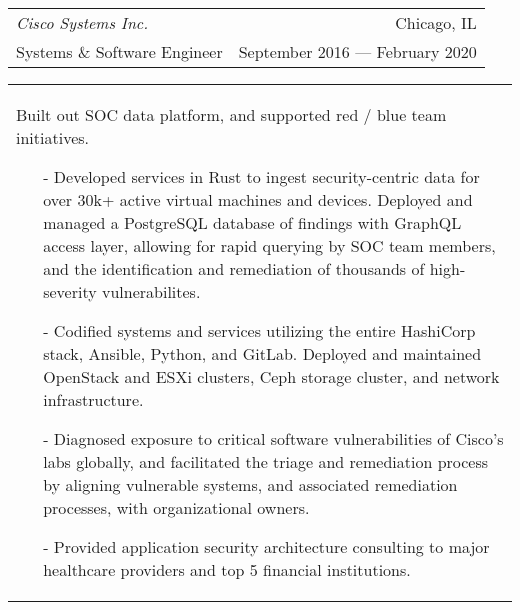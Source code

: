 \begin{tabularx}{\textwidth}{L R}
    \normalsize\textit{Cisco Systems Inc.} & Chicago, IL \\
    \hspace{10pt}Systems \& Software Engineer & September 2016 --- February 2020 \\
\end{tabularx}
\begin{tabularx}{\textwidth}{X}
    \hspace{10pt}Built out SOC data platform, and supported red / blue team initiatives.
    \begin{itemize}
        \itemsep{}
        \item[-] Developed services in Rust to ingest security-centric data for over 30k+ active virtual machines and devices. Deployed and managed a PostgreSQL database of findings with GraphQL access layer, allowing for rapid querying by SOC team members, and the identification and remediation of thousands of high-severity vulnerabilites.
        \item[-] Codified systems and services utilizing the entire HashiCorp stack, Ansible, Python, and GitLab. Deployed and maintained OpenStack and ESXi clusters, Ceph storage cluster, and network infrastructure.
        \item[-] Diagnosed exposure to critical software vulnerabilities of Cisco's labs globally, and facilitated the triage and remediation process by aligning vulnerable systems, and associated remediation processes, with organizational owners.
        \item[-] Provided application security architecture consulting to major healthcare providers and top 5 financial institutions.
    \end{itemize}
\end{tabularx}


